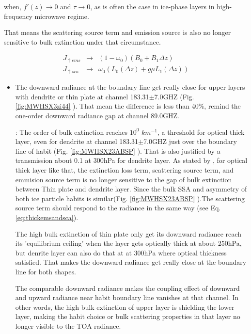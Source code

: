 when, $f'(z) \to 0$ and $\tau \to 0$, as is often the case in ice-phase layers in high-frequency microwave regime.  

That means the scattering source term and emission source is also no longer sensitive to bulk extinction under that circumstance.

\begin{eqnarray} \label{eq:thickemsandsca}
J_{\uparrow ems} & \to & (1-\omega_{0})(B_{0} + B_{1}\Delta z) \nonumber\\
J_{\uparrow sca} & \to & \omega_{0}(L_{0}(\Delta z) + g\mu L_{1}(\Delta z))
\end{eqnarray}

\begin{itemize}
    \item {}
    The downward radiance at the boundary line get really close for upper layers with dendrite or thin plate at channel 183.31$\pm$7.0GHZ
    (Fig. \ref{fig:MWHSX3zi44} ).
That mean the difference is less than 40\%, remind the one-order downward radiance gap at channel 89.0GHZ. 

    : The order of bulk extinction reaches $10^{0}$ $km^{-1}$, a threshold for optical thick layer,
even for dendrite at channel 183.31$\pm$7.0GHZ just over the boundary line of habit (Fig. \ref{fig:MWHSX23ABSP} ). 
That is also justified by a transmission about 0.1 at 300hPa for dendrite layer. 
    As stated by , for optical thick layer like that, the extinction loss term, scattering source term, and emmision source term
is no longer sensitive to the gap of bulk extinction between Thin plate and dendrite layer. Since the bulk SSA and asymmetry of both ice particle habits
is similar(Fig. \ref{fig:MWHSX23ABSP} ).The scattering source term should respond to the radiance in the same way (see Eq. \ref{eq:thickemsandsca}).

    The high bulk extinction of thin plate only get its downward radiance reach its 'equilibrium ceiling' when the layer gets optically thick at about 250hPa, but
denrite layer can also do that at at 300hPa where optical thickness satisfied. That makes the downward radiance get really close at the boundary line for both shapes.

    The comparable downward radiance makes the coupling effect of downward and upward radiance near habit boundary line vanishes at that channel. In other words,
the high bulk extinction of upper layer is shielding the lower layer, making the habit choice or bulk scattering properties in that layer no longer visible to the TOA radiance.


\end{itemize}
